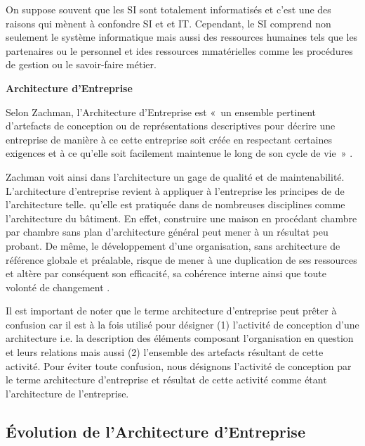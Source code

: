 On suppose souvent que les SI sont totalement informatisés et c'est une des 
raisons qui mènent à confondre SI et et IT. Cependant, le SI comprend non seulement 
le système informatique mais aussi des ressources humaines tels que les partenaires 
ou le personnel et ides ressources mmatérielles comme les procédures de gestion ou le savoir-faire métier.

\textbf{Architecture d'Entreprise}

Selon Zachman, l'Architecture d'Entreprise est «~un ensemble pertinent d'artefacts de conception ou de représentations descriptives pour décrire une entreprise de manière à ce cette entreprise soit créée en respectant certaines exigences et à ce qu'elle soit facilement maintenue le long de son cycle de vie~» \cite{zachman1997enterprise}. 

Zachman voit ainsi dans l'architecture un gage de qualité et de maintenabilité. L'architecture d'entreprise revient à appliquer à l'entreprise les principes de de l'architecture telle. qu'elle est pratiquée dans de nombreuses disciplines comme l'architecture du bâtiment. En effet, construire une maison en procédant chambre par chambre sans plan d'architecture général peut mener à un résultat peu probant. De même, le développement d'une organisation, sans 
architecture de référence globale et préalable, risque de mener à une 
duplication de ses ressources et altère par conséquent son efficacité, sa cohérence interne ainsi que toute volonté de changement \cite{zachman1997enterprise} \cite{bernard2012introduction}. 

Il est important de noter que le terme architecture d'entreprise peut prêter à 
confusion car il est à la fois utilisé pour désigner (1) l'activité de 
conception d'une architecture i.e. la description des éléments composant 
l'organisation en question et leurs relations mais aussi (2) l'ensemble des 
artefacts résultant de cette activité. 
Pour éviter toute confusion, nous désignons l'activité de conception par le 
terme architecture d'entreprise et résultat de cette activité comme étant 
l'architecture de l'entreprise.


	\subsection{Évolution de l'Architecture d'Entreprise}


